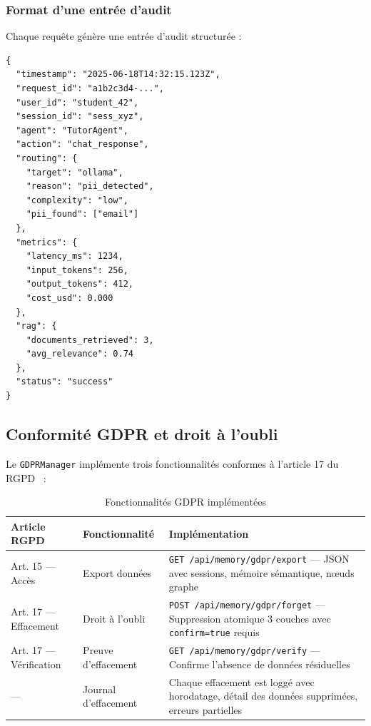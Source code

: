 \documentclass[12pt, a4paper]{article}
\begin{document}
\subsubsection{Format d'une entrée d'audit}

Chaque requête génère une entrée d'audit structurée :

\begin{lstlisting}[style=jsonstyle, caption={Exemple d'entrée d'audit JSON}, label={lst:audit}]
{
  "timestamp": "2025-06-18T14:32:15.123Z",
  "request_id": "a1b2c3d4-...",
  "user_id": "student_42",
  "session_id": "sess_xyz",
  "agent": "TutorAgent",
  "action": "chat_response",
  "routing": {
    "target": "ollama",
    "reason": "pii_detected",
    "complexity": "low",
    "pii_found": ["email"]
  },
  "metrics": {
    "latency_ms": 1234,
    "input_tokens": 256,
    "output_tokens": 412,
    "cost_usd": 0.000
  },
  "rag": {
    "documents_retrieved": 3,
    "avg_relevance": 0.74
  },
  "status": "success"
}
\end{lstlisting}

\subsection{Conformité GDPR et droit à l'oubli}

Le \texttt{GDPRManager} implémente trois fonctionnalités conformes à l'article 17 du RGPD~\cite{voigt2017gdpr} :

\begin{table}[H]
\centering
\caption{Fonctionnalités GDPR implémentées}
\label{tab:gdpr}
\small
\begin{tabularx}{\textwidth}{l l X}
\toprule
\textbf{Article RGPD} & \textbf{Fonctionnalité} & \textbf{Implémentation} \\
\midrule
Art. 15 — Accès & Export données & \texttt{GET /api/memory/gdpr/export} — JSON avec sessions, mémoire sémantique, n\oe{}uds graphe \\
\addlinespace
Art. 17 — Effacement & Droit à l'oubli & \texttt{POST /api/memory/gdpr/forget} — Suppression atomique 3 couches avec \texttt{confirm=true} requis \\
\addlinespace
Art. 17 — Vérification & Preuve d'effacement & \texttt{GET /api/memory/gdpr/verify} — Confirme l'absence de données résiduelles \\
\addlinespace
— & Journal d'effacement & Chaque effacement est loggé avec horodatage, détail des données supprimées, erreurs partielles \\
\bottomrule
\end{tabularx}
\end{table}
\end{document}
